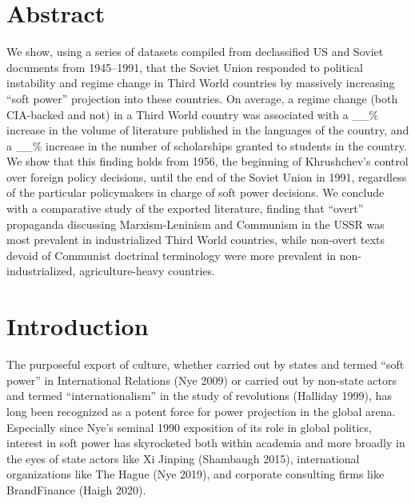 

\section*{Abstract}

We show, using a series of datasets compiled from declassified US and Soviet documents from 1945--1991, that the Soviet Union responded to political instability and regime change in Third World countries by massively increasing ``soft power'' projection into these countries. On average, a regime change (both CIA-backed and not) in a Third World country was associated with a \_\_\% increase in the volume of literature published in the languages of the country, and a \_\_\% increase in the number of scholarships granted to students in the country. We show that this finding holds from 1956, the beginning of Khrushchev's control over foreign policy decisions, until the end of the Soviet Union in 1991, regardless of the particular policymakers in charge of soft power decisions. We conclude with a comparative study of the exported literature, finding that ``overt'' propaganda discussing Marxism-Leninism and Communism in the USSR was most prevalent in industrialized Third World countries, while non-overt texts devoid of Communist doctrinal terminology were more prevalent in non-industrialized, agriculture-heavy countries.

\section{Introduction}

The purposeful export of culture, whether carried out by states and termed ``soft power'' in International Relations (Nye 2009) or carried out by non-state actors and termed ``internationalism'' in the study of revolutions (Halliday 1999), has long been recognized as a potent force for power projection in the global arena. Especially since Nye's seminal 1990 exposition of its role in global politics, interest in soft power has skyrocketed both within academia and more broadly in the eyes of state actors like Xi Jinping (Shambaugh 2015), international organizations like The Hague (Nye 2019), and corporate consulting firms like BrandFinance (Haigh 2020).

